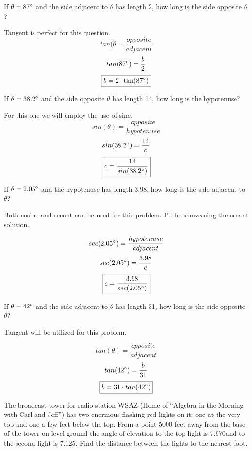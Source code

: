 \documentclass[10pt,letterpaper]{amspset}
\begin{document}
\begin{problem}[72]
If $\theta = 87\degree$  and the side adjacent to $\theta$ has length 2, how long is the side opposite $\theta$?
\end{problem}

\begin{solution}[Solution]
Tangent is perfect for this question.
\[tan(\theta = \frac{opposite}{adjacent}\]
\[tan(87\degree) = \frac{b}{2}\]
\[\boxed{b = 2 \cdot \tan(87\degree)}\]
\end{solution}


\begin{problem}[73]
If $\theta = 38.2\degree$ and the side opposite $\theta$ has length 14, how long is the hypotenuse?
\end{problem}

\begin{solution}[Solution]
For this one we will employ the use of sine. 
\[sin(\theta) = \frac{opposite}{hypotenuse}\]
\[sin(38.2\degree) = \frac{14}{c}\]
\[\boxed{c = \frac{14}{sin(38.2\degree)}}\]
\end{solution}

\begin{problem}[74]
If $\theta = 2.05\degree$ and the hypotenuse has length 3.98, how long is the side adjacent to $\theta$?
\end{problem}

\begin{solution}[Solution]
Both cosine and secant can be used for this problem. I'll be showcasing the secant solution.

\[sec(2.05\degree) = \frac{hypotenuse}{adjacent}\]
\[sec(2.05 \degree) = \frac{3.98}{c}\]
\[\boxed{c = \frac{3.98}{sec(2.05 \degree)}}\]
\end{solution}


\begin{problem}[75]
If $\theta = 42\degree$ and the side adjacent to $\theta$ has length 31, how long is the side opposite $\theta$?
\end{problem}

\begin{solution}[Solution]
Tangent will be utilized for this problem.

\[tan(\theta) = \frac{opposite}{adjacent}\]
\[tan(42\degree) = \frac{b}{31}\]
\[\boxed{b = 31 \cdot tan(42\degree)}\]
\end{solution}


\pagebreak


\begin{problem}[77]
The broadcast tower for radio station WSAZ (Home of “Algebra in the Morning with Carl and Jeff”) has two enormous flashing red lights on it: one at the very top and one a few feet below the top. From a point 5000 feet away from the base of the tower on level ground the angle of elevation to the top light is 7.970\degree and to the second light is 7.125\degree. Find the distance between the lights to the nearest foot.
\end{problem}
\end{document}
